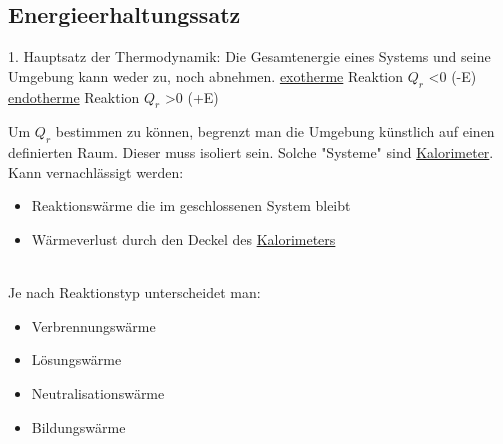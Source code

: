 \subsection{Energieerhaltungssatz}
1. Hauptsatz der Thermodynamik: \newline
Die Gesamtenergie eines Systems und seine Umgebung kann weder zu, noch abnehmen.\newline
\hyperref[sec:endo_exotherm]{exotherme} Reaktion $Q_r$ \textless 0 (-E) \newline
\hyperref[sec:endo_exotherm]{endotherme} Reaktion $Q_r$ \textgreater 0 (+E)

Um $Q_r$ bestimmen zu können, begrenzt man die Umgebung künstlich auf einen definierten Raum.
Dieser muss isoliert sein.
Solche "Systeme" sind \hyperref[sec:kalorimeter]{Kalorimeter}. \\ 
Kann vernachlässigt werden: 

\begin{itemize}
    \item Reaktionswärme die im geschlossenen System bleibt
    \item Wärmeverlust durch den Deckel des \hyperref[sec:kalorimeter]{Kalorimeters}
\end{itemize} 
\ \\
Je nach Reaktionstyp unterscheidet man:

\begin{itemize}
    \item Verbrennungswärme
    \item Lösungswärme
    \item Neutralisationswärme
    \item Bildungswärme
\end{itemize}
